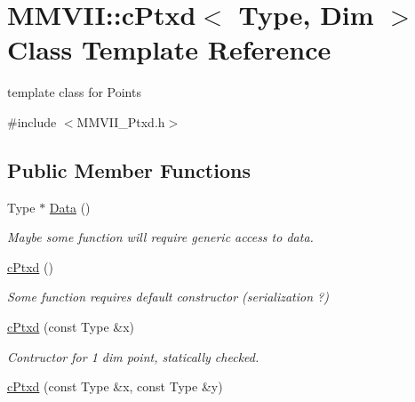 \hypertarget{classMMVII_1_1cPtxd}{}\section{M\+M\+V\+II\+:\+:c\+Ptxd$<$ Type, Dim $>$ Class Template Reference}
\label{classMMVII_1_1cPtxd}


template class for Points  




{\ttfamily \#include $<$M\+M\+V\+I\+I\+\_\+\+Ptxd.\+h$>$}

\subsection*{Public Member Functions}
\begin{DoxyCompactItemize}
\item 
Type $\ast$ \hyperlink{classMMVII_1_1cPtxd_a254cef7d4763709a60c050a76769ed7e}{Data} ()\hypertarget{classMMVII_1_1cPtxd_a254cef7d4763709a60c050a76769ed7e}{}\label{classMMVII_1_1cPtxd_a254cef7d4763709a60c050a76769ed7e}

\begin{DoxyCompactList}\small\item\em Maybe some function will require generic access to data. \end{DoxyCompactList}\item 
\hyperlink{classMMVII_1_1cPtxd_a39cf2386f3c108d3b127e61bb80a4944}{c\+Ptxd} ()\hypertarget{classMMVII_1_1cPtxd_a39cf2386f3c108d3b127e61bb80a4944}{}\label{classMMVII_1_1cPtxd_a39cf2386f3c108d3b127e61bb80a4944}

\begin{DoxyCompactList}\small\item\em Some function requires default constructor (serialization ?) \end{DoxyCompactList}\item 
\hyperlink{classMMVII_1_1cPtxd_aee641a1e0002e6e03dd5f6355680317a}{c\+Ptxd} (const Type \&x)\hypertarget{classMMVII_1_1cPtxd_aee641a1e0002e6e03dd5f6355680317a}{}\label{classMMVII_1_1cPtxd_aee641a1e0002e6e03dd5f6355680317a}

\begin{DoxyCompactList}\small\item\em Contructor for 1 dim point, statically checked. \end{DoxyCompactList}\item 
\hyperlink{classMMVII_1_1cPtxd_a23403b22f98b0dc46012f40661609583}{c\+Ptxd} (const Type \&x, const Type \&y)\hypertarget{classMMVII_1_1cPtxd_a23403b22f98b0dc46012f40661609583}{}\label{classMMVII_1_1cPtxd_a23403b22f98b0dc46012f40661609583}


\end{DoxyCompactItemize}
